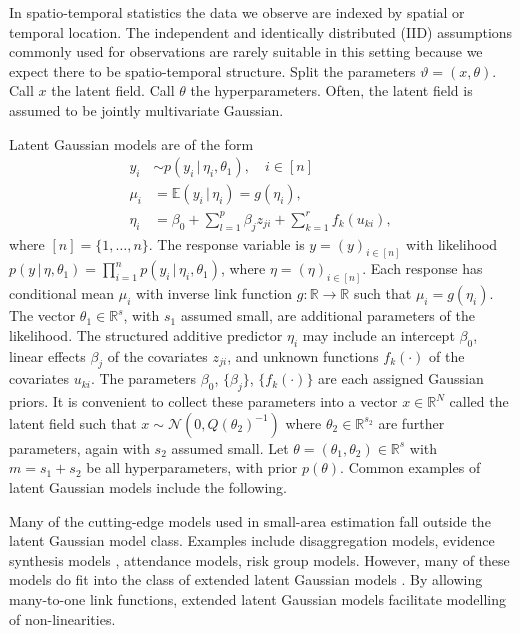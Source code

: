 \documentclass[a4paper, nobind]{templates/ociamthesis}
\begin{document}
In spatio-temporal statistics the data we observe are indexed by spatial or temporal location.
The independent and identically distributed (IID) assumptions commonly used for observations are rarely suitable in this setting because we expect there to be spatio-temporal structure.
Split the parameters \(\vartheta = (x, \theta)\).
Call \(x\) the latent field.
Call \(\theta\) the hyperparameters.
Often, the latent field is assumed to be jointly multivariate Gaussian.

Latent Gaussian models \autocite{rue2009approximate} are of the form
\begin{align*}
y_i &\sim p(y_i \, | \, \eta_i, \theta_1), \quad i \in [n]\\
\mu_i &= \mathbb{E}(y_i \, | \, \eta_i) = g(\eta_i), \\
\eta_i &= \beta_0 + \sum_{l = 1}^{p} \beta_j z_{ji} + \sum_{k = 1}^{r} f_k(u_{ki}),
\end{align*}
where \([n] = \{1, \ldots, n\}\).
The response variable is \(y = (y)_{i \in [n]}\) with likelihood \(p(y \, | \, \eta, \theta_1) = \prod_{i = 1}^n p(y_i \, | \, \eta_i, \theta_1)\), where \(\eta = (\eta)_{i \in [n]}\).
Each response has conditional mean \(\mu_i\) with inverse link function \(g: \mathbb{R} \to \mathbb{R}\) such that \(\mu_i = g(\eta_i)\).
The vector \(\theta_1 \in \mathbb{R}^s\), with \(s_1\) assumed small, are additional parameters of the likelihood.
The structured additive predictor \(\eta_i\) may include an intercept \(\beta_0\), linear effects \(\beta_j\) of the covariates \(z_{ji}\), and unknown functions \(f_k(\cdot)\) of the covariates \(u_{ki}\).
The parameters \(\beta_0\), \(\{\beta_j\}\), \(\{f_k(\cdot)\}\) are each assigned Gaussian priors.
It is convenient to collect these parameters into a vector \(x \in \mathbb{R}^N\) called the latent field such that \(x \sim \mathcal{N}(0, Q(\theta_2)^{-1})\) where \(\theta_2 \in \mathbb{R}^{s_2}\) are further parameters, again with \(s_2\) assumed small.
Let \(\theta = (\theta_1, \theta_2) \in \mathbb{R}^s\) with \(m = s_1 + s_2\) be all hyperparameters, with prior \(p(\theta)\).
Common examples of latent Gaussian models include the following.

Many of the cutting-edge models used in small-area estimation fall outside the latent Gaussian model class.
Examples include disaggregation models, evidence synthesis models \autocite{eaton2019joint,eaton2021naomi}, attendance models, risk group models.
However, many of these models do fit into the class of extended latent Gaussian models \autocite{stringer2021fast}.
By allowing many-to-one link functions, extended latent Gaussian models facilitate modelling of non-linearities.
\end{document}
